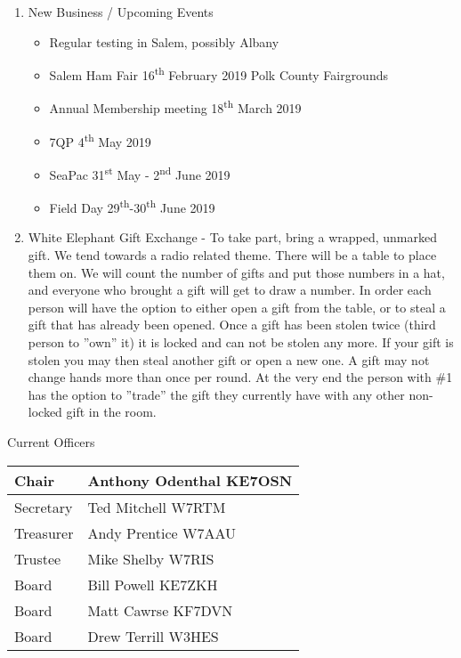 \documentclass[letter,11pt]{extarticle}
\begin{document}
\begin{enumerate}
		\item  New Business / Upcoming Events
			\begin{itemize}
				\item Regular testing in Salem, possibly Albany
				\item Salem Ham Fair 16\textsuperscript{th} February 2019 Polk County Fairgrounds
				\item Annual Membership meeting 18\textsuperscript{th} March 2019
				\item 7QP 4\textsuperscript{th} May 2019
				\item SeaPac 31\textsuperscript{st} May - 2\textsuperscript{nd} June 2019
				\item Field Day 29\textsuperscript{th}-30\textsuperscript{th} June 2019
			\end{itemize}
\item White Elephant Gift Exchange - To take part, bring a wrapped, unmarked gift. We tend towards a radio related theme. There will be a table to place them on. We will count the number of gifts and put those numbers in a hat, and everyone who brought a gift will get to draw a number. In order each person will have the option to either open a gift from the table, or to steal a gift that has already been opened. Once a gift has been stolen twice (third person to ''own'' it) it is locked and can not be stolen any more. If your gift is stolen you may then steal another gift or open a new one. A gift may not change hands more than once per round. At the very end the person with \#1 has the option to ''trade'' the gift they currently have with any other non-locked gift in the room.
	\end{enumerate}


	Current Officers \\
	\begin{tabular}{|l|l|} \hline
		Chair & Anthony Odenthal KE7OSN \\ \hline
		Secretary & Ted Mitchell W7RTM \\ \hline
		Treasurer & Andy Prentice W7AAU \\ \hline
		Trustee & Mike Shelby W7RIS   \\ \hline
		Board & Bill Powell KE7ZKH \\ \hline
		Board & Matt Cawrse KF7DVN \\ \hline
		Board & Drew Terrill W3HES\\ \hline
	\end{tabular}
	
	\subsection*{}
	
\end{document}
